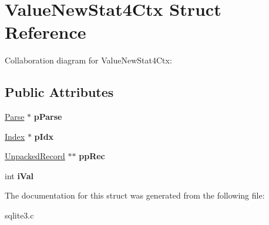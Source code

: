\hypertarget{structValueNewStat4Ctx}{}\section{Value\+New\+Stat4\+Ctx Struct Reference}
\label{structValueNewStat4Ctx}


Collaboration diagram for Value\+New\+Stat4\+Ctx\+:
\subsection*{Public Attributes}
\begin{DoxyCompactItemize}
\item 
\hyperlink{structParse}{Parse} $\ast$ {\bfseries p\+Parse}\hypertarget{structValueNewStat4Ctx_aa1d5c751a45f4e608dbd883179dd2f18}{}\label{structValueNewStat4Ctx_aa1d5c751a45f4e608dbd883179dd2f18}

\item 
\hyperlink{structIndex}{Index} $\ast$ {\bfseries p\+Idx}\hypertarget{structValueNewStat4Ctx_a31a0ab3baf8fab451df095591408acad}{}\label{structValueNewStat4Ctx_a31a0ab3baf8fab451df095591408acad}

\item 
\hyperlink{structUnpackedRecord}{Unpacked\+Record} $\ast$$\ast$ {\bfseries pp\+Rec}\hypertarget{structValueNewStat4Ctx_a64e1490828ea95f9edc650a776a121d9}{}\label{structValueNewStat4Ctx_a64e1490828ea95f9edc650a776a121d9}

\item 
int {\bfseries i\+Val}\hypertarget{structValueNewStat4Ctx_a54d56872d3653e59a00a91ea1c6b7664}{}\label{structValueNewStat4Ctx_a54d56872d3653e59a00a91ea1c6b7664}

\end{DoxyCompactItemize}


The documentation for this struct was generated from the following file\+:\begin{DoxyCompactItemize}
\item 
sqlite3.\+c\end{DoxyCompactItemize}
